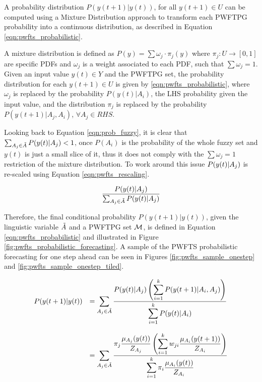 A probability distribution $P( y(t+1) | y(t))$, for all  $y(t+1) \in U$ can be computed using a Mixture Distribution approach to transform each PWFTPG probability into a continuous distribution, as described in Equation \eqref{eqn:pwfts_probabilistic}.

A mixture distribution is defined as $P(y) = \sum \omega_j \cdot \pi_j(y)$ where $\pi_j: U \rightarrow [0,1]$ are specific PDFs and $\omega_j$ is a weight associated to each PDF, such that $\sum \omega_j = 1$. Given an input value $y(t) \in Y$ and the PWFTPG set, the probability distribution for each $y(t+1) \in U$ is given by \eqref{eqn:pwfts_probabilistic}, where $\omega_j$ is replaced by the probability $P(y(t)|A_i)$, the LHS probability given the input value, and the distribution $\pi_j$ is replaced by the probability $P(y(t+1)|A_j,A_i)$, $\forall A_j \in RHS$. 

Looking back to Equation \eqref{eqn:prob_fuzzy}, it is clear that $\sum_{A_j \in  \tilde{A}} P(y(t)|A_j) < 1$, once $P(A_i)$ is the probability of the whole fuzzy set and $y(t)$ is just a small slice of it, thus it does not comply with the $\sum \omega_j = 1$ restriction of the mixture distribution. To work around this issue $P(y(t)|A_j)$ is re-scaled using Equation \eqref{eqn:pwfts_rescaling}.

\begin{equation}
\frac{P(y(t)|A_j)}{\sum_{A_j \in \tilde{A}} P(y(t)|A_j)}      
\label{eqn:pwfts_rescaling}
\end{equation}

Therefore, the final conditional probability $P(y(t+1) | y(t))$,  given the linguistic variable $\tilde{A}$ and a PWFTPG set $\mathcal{M}$, is defined in Equation \eqref{eqn:pwfts_probabilistic} and illustrated in Figure \ref{fig:pwfts_probabilistic_forecasting}. A sample of the PWFTS probabilistic forecasting for one step ahead can be seen in Figures \ref{fig:pwfts_sample_onestep} and \ref{fig:pwfts_sample_onestep_tiled}.

\begin{equation}
\begin{array}{cl}
P(y(t+1) | y(t)) &=  \displaystyle \sum_{A_j \in  \tilde{A}}\frac{\displaystyle P(y(t)| A_j) \left( \sum_{i = 1}^k  P(y(t+1) | A_i,A_j) \right)}{\displaystyle \sum_{i = 1}^k P(y(t)| A_i)}  \\
& \\
 &= \displaystyle \sum_{A_j \in  \tilde{A}} \frac{ \displaystyle  \pi_j\frac{\mu_{A_j}(y(t))}{Z_{A_j}} \left( \sum_{i = 1}^k  w_{ji}\frac{\mu_{A_i}(y(t+1))}{Z_{A_i}} \right)}{\displaystyle \sum_{i = 1}^k \pi_i\frac{\mu_{A_i}(y(t))}{Z_{A_i}}}
\end{array}
\label{eqn:pwfts_probabilistic}
\end{equation}

